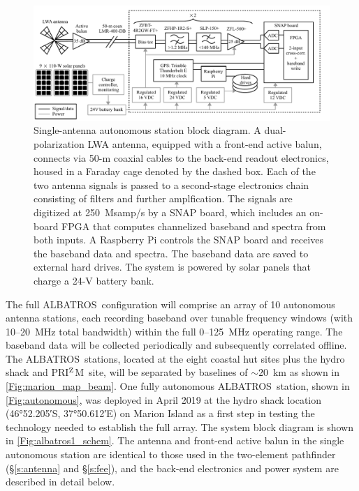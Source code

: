 \documentclass{ws-jai}
\def\albatros{ALBATROS}
\def\prizm{PRI$^{\rm Z}$M}
\begin{document}
\begin{figure}
  \begin{center}
    \includegraphics[width=\linewidth]{Figures/albatros_single_schematic/albatros_single_schematic.pdf}
    \caption{Single-antenna autonomous station block diagram.  A
      dual-polarization LWA antenna, equipped with a front-end active
      balun, connects via 50-m coaxial cables to the back-end readout
      electronics, housed in a Faraday cage denoted by the dashed box.
      Each of the two antenna signals is passed to a second-stage
      electronics chain consisting of filters and further
      amplfication.  The signals are digitized at 250~Msamp/s by a
      SNAP board, which includes an on-board FPGA that computes
      channelized baseband and spectra from both inputs.  A Raspberry
      Pi controls the SNAP board and receives the baseband data and
      spectra.  The baseband data are saved to external hard drives.
      The system is powered by solar panels that charge a 24-V battery
      bank.}
    \label{Fig:albatros1_schem}
  \end{center}
\end{figure}

The full \albatros\ configuration will comprise an array of 10
autonomous antenna stations, each recording baseband over tunable
frequency windows (with 10--20~MHz total bandwidth) within the full
0--125~MHz operating range.  The baseband data will be collected
periodically and subsequently correlated offline.  The
\albatros\ stations, located at the eight coastal hut sites plus the
hydro shack and \prizm\ site, will be separated by baselines of
$\sim20$~km as shown in \autoref{Fig:marion_map_beam}. One fully
autonomous \albatros\ station, shown in \autoref{Fig:autonomous}, was
deployed in April 2019 at the hydro shack location (\ang{46;52.205;}S,
\ang{37;50.612;}E) on Marion Island as a first step in testing the
technology needed to establish the full array.  The system block
diagram is shown in \autoref{Fig:albatros1_schem}.  The antenna and
front-end active balun in the single autonomous station are identical
to those used in the two-element pathfinder (\S\ref{s:antenna} and
\S\ref{s:fee}), and the back-end electronics and power system are
described in detail below.
\end{document}
